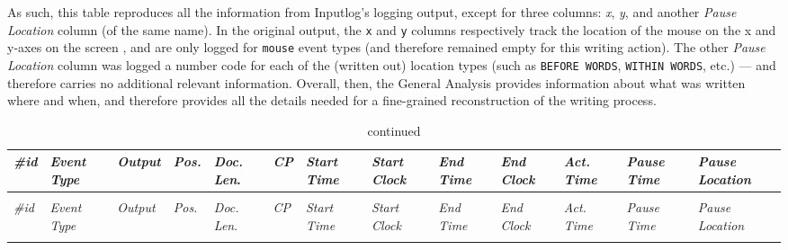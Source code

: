 \begin{paper}
\begin{subappendices}
As such, this table reproduces all the information from Inputlog's logging output, except for three columns: \textit{x}, \textit{y}, and another \textit{Pause Location} column (of the same name). In the original output, the \verb|x| and \verb|y| columns  respectively track the location of the mouse on the x and y-axes on the screen \citep{leijten_keystroke_2013}, and are only logged for \verb|mouse| event types (and therefore remained empty for this writing action). The other \textit{Pause Location} column was logged a number code for each of the (written out) location types (such as \verb|BEFORE WORDS|, \verb|WITHIN WORDS|, etc.) --- and therefore carries no additional relevant information. Overall, then, the General Analysis provides information about what
was written where and when, and therefore provides all the details
needed for a fine-grained reconstruction of the writing process.


\begin{center}
\centering\tiny\renewcommand{\arraystretch}{1.5}

\begin{longtable}[]{@{}p{}p{}|p{}|p{}p{}p{}p{}p{}p{}p{}p{}p{}p{}@{}}
\caption{\label{tab:bekius:general}}  \\
\toprule
\textit{\#id} & \textit{Event Type} & \textit{Output} & \textit{Pos.} & \textit{Doc. Len}. & \textit{CP} & \textit{Start Time} & \textit{Start Clock} & \textit{End Time }& \textit{End Clock} & \textit{Act. Time} & \textit{Pause Time} & \textit{Pause Location}\tabularnewline
\midrule
\endfirsthead

\caption{continued}  \\
\toprule
\textit{\#id} & \textit{Event Type} & \textit{Output} & \textit{Pos.} & \textit{Doc. Len}. & \textit{CP} & \textit{Start Time} & \textit{Start Clock} & \textit{End Time }& \textit{End Clock} & \textit{Act. Time} & \textit{Pause Time} &\textit{Pause Location}\tabularnewline
\midrule
\endhead

\bottomrule
\endfoot


\end{longtable}
\end{center}
\end{subappendices}
\end{paper}
